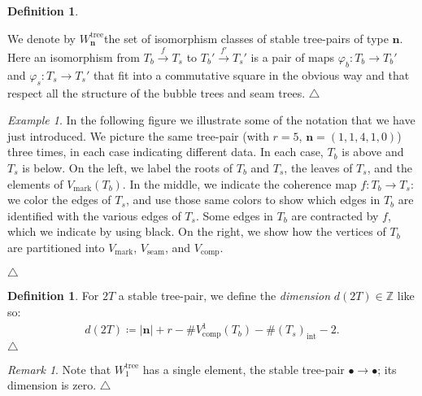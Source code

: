 \documentclass[11pt]{amsart}
\theoremstyle{definition}
\newtheorem{definition}[theorem]{Definition}
\theoremstyle{remark}
\newtheorem{remark}[theorem]{Remark}
\newtheorem{example}[theorem]{Example}
\theoremstyle{plain}
\newcommand{\bZ}{\mathbb{Z}}
\newcommand\bn{\mathbf{n}}
\newcommand{\on}{\operatorname}
\newcommand{\comp}{C^2}
\renewcommand{\comp}{{\on{comp}}}
\newcommand{\seam}{{\on{seam}}}
\newcommand{\mk}{{\on{mark}}}
\newcommand{\inte}{{\on{int}}}
\newcommand{\tree}{{\on{tree}}}
\newcommand{\sr}{\stackrel}
\begin{document}
\begin{definition}
\begin{itemize}
\begin{itemize}
		\end{itemize}
\end{itemize}
We denote by $W_\bn^\tree$\label{p:Wntree} the set of isomorphism classes of stable tree-pairs of type $\bn$.
Here an isomorphism from $T_b \sr{f}{\to} T_s$ to $T_b' \sr{f'}{\to} T_s'$ is a pair of maps $\varphi_b\colon T_b \to T_b'$ and $\varphi_s\colon T_s \to T_s'$ that fit into a commutative square in the obvious way and that respect all the structure of the bubble trees and seam trees.
\null\hfill$\triangle$
\end{definition}


\begin{example}
\label{ex:tree-pair_examples}
In the following figure we illustrate some of the notation that we have just introduced.
We picture the same tree-pair (with $r = 5$, $\bn = (1,1,4,1,0)$) three times, in each case indicating different data.
In each case, $T_b$ is above and $T_s$ is below.
On the left, we label the roots of $T_b$ and $T_s$, the leaves of $T_s$, and the elements of $V_\mk(T_b)$.
In the middle, we indicate the coherence map $f\colon T_b \to T_s$: we color the edges of $T_s$, and use those same colors to show which edges in $T_b$ are identified with the various edges of $T_s$.
Some edges in $T_b$ are contracted by $f$, which we indicate by using black.
On the right, we show how the vertices of $T_b$ are partitioned into $V_\mk$, $V_\seam$, and $V_\comp$.

\begin{figure}[H]
\centering
\def\svgwidth{1.0\columnwidth}

\label{fig:tree-pair_examples}
\end{figure}
\null\hfill$\triangle$
\end{example}


\begin{definition}
\label{def:tree-pair_dim}
For $2T$ a stable tree-pair, we define the \emph{dimension} $d(2T) \in \bZ$ like so:
\begin{align} \label{eq:tree-pair_dim}
d(2T) \coloneqq |\bn| + r - \#\!V^1_\comp(T_b) - \#\!(T_s)_\inte - 2.
\end{align}
\null\hfill$\triangle$
\end{definition}

\begin{remark}
Note that $W_1^\tree$ has a single element, the stable tree-pair $\bullet \to \bullet$; its dimension is zero.
\null\hfill$\triangle$
\end{remark}
\end{document}
